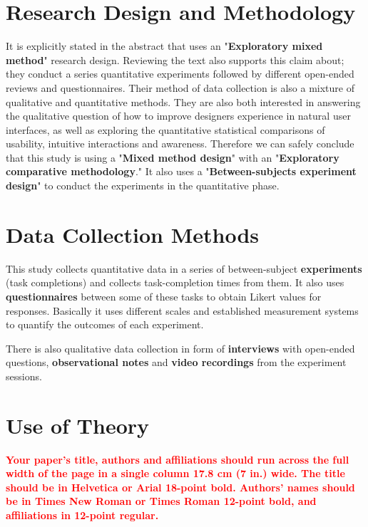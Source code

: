 \documentclass{sigchi}
\begin{document}
\section{Research Design and Methodology}
It is explicitly stated in the abstract that \cite{10.1093/iwc/iwv003} uses an "\textbf{Exploratory mixed method}" research design. Reviewing the text also supports this claim about; they conduct a series quantitative experiments followed by different open-ended reviews and questionnaires. Their method of data collection is also a mixture of qualitative and quantitative methods. They are also both interested in answering the qualitative question of how to improve designers experience in natural user interfaces, as well as exploring the quantitative statistical comparisons of usability, intuitive interactions and awareness. Therefore we can safely conclude that this study is using a "\textbf{Mixed method design}" with an "\textbf{Exploratory comparative methodology}." It also uses a "\textbf{Between-subjects experiment design}" to conduct the experiments in the quantitative phase. 

\section{Data Collection Methods}
This study collects quantitative data in a series of between-subject \textbf{experiments} (task completions) and collects task-completion times from them. It also uses \textbf{questionnaires} between some of these tasks to obtain Likert values for responses. Basically it uses different scales and established measurement systems to quantify the outcomes of each experiment. 

There is also qualitative data collection in form of \textbf{interviews} with open-ended questions, \textbf{observational notes} and \textbf{video recordings} from the experiment sessions.

\section{Use of Theory}
\textbf{\textcolor{red}{Your paper's title, authors and affiliations should run across the
full width of the page in a single column 17.8 cm (7 in.) wide.  The
title should be in Helvetica or Arial 18-point bold.  Authors' names
should be in Times New Roman or Times Roman 12-point bold, and
affiliations in 12-point regular. }
} 
\end{document}
